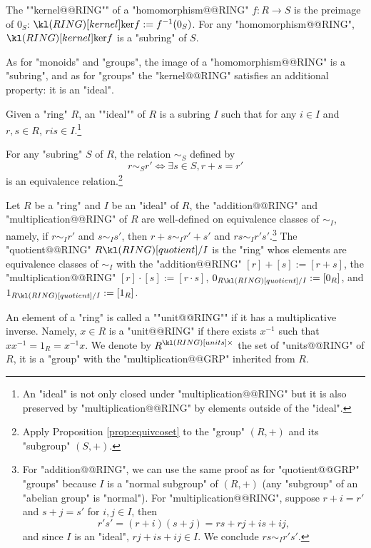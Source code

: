 \documentclass[main.tex]{subfiles}
\begin{document}
\begin{defn}[Kernel]
	\AP The ""kernel@@RING"" of a "homomorphism@@RING" $f: R \rightarrow S$ is the preimage of $0_S$: $\kerring{f} := f^{-1}(0_S)$. For any "homomorphism@@RING", $\kerring{f}$ is a "subring" of $S$.
\end{defn}
As for "monoids" and "groups", the image of a "homomorphism@@RING" is a "subring", and as for "groups" the "kernel@@RING" satisfies an additional property: it is an "ideal".
\begin{defn}[Ideal]
	\AP Given a "ring" $R$, an ""ideal"" of $R$ is a subring $I$ such that for any $i \in I$ and $r,s \in R$, $ris \in I$.\footnote{An "ideal" is not only closed under "multiplication@@RING" but it is also preserved by "multiplication@@RING" by elements outside of the "ideal".}
\end{defn}
\begin{prop}
	For any "subring" $S$ of $R$, the relation $\sim_S$ defined by 
	\[r \sim_S r' \Leftrightarrow \exists s \in S, r+s = r'\]
	is an equivalence relation.\footnote{Apply Proposition \ref{prop:equivcoset} to the "group" $(R,+)$ and its "subgroup" $(S,+)$.}
\end{prop}
\begin{defn}[Quotient]
	Let $R$ be a "ring" and $I$ be an "ideal" of $R$, the "addition@@RING" and "multiplication@@RING" of $R$ are well-defined on equivalence classes of $\sim_I$, namely, if $r \sim_I r'$ and $s \sim_I s'$, then $r+s \sim_I r'+s'$ and $rs \sim_I r's'$.\footnote{For "addition@@RING", we can use the same proof as for "quotient@@GRP" "groups" because $I$ is a "normal subgroup" of $(R,+)$ (any "subgroup" of an "abelian group" is "normal"). For "multiplication@@RING", suppose $r+i = r'$ and $s+j = s'$ for $i,j \in I$, then \[r's' = (r+i)(s+j) = rs+rj+is+ij,\] and since $I$ is an "ideal", $rj+is+ij \in I$. We conclude $rs \sim_I r's'$.} \AP The "quotient@@RING" $\quotRING{R}{I}$ is the "ring" whos elements are equivalence classes of $\sim_I$ with the "addition@@RING" $[r]+[s] := [r+s]$, the "multiplication@@RING" $[r]\cdot [s] :=  [r\cdot s]$, $0_{\quotRING{R}{I}} := [0_R]$, and $1_{\quotRING{R}{I}} := [1_R]$.
\end{defn}
\begin{defn}[Units]
	\AP An element of a "ring" is called a ""unit@@RING"" if it has a multiplicative inverse. Namely, $x \in R$ is a "unit@@RING" if there exists $x^{-1}$ such that $xx^{-1} = 1_R = x^{-1}x$. We denote by $\units{R}$ the set of "units@@RING" of $R$, it is a "group" with the "multiplication@@GRP" inherited from $R$.
\end{defn}
\end{document}
